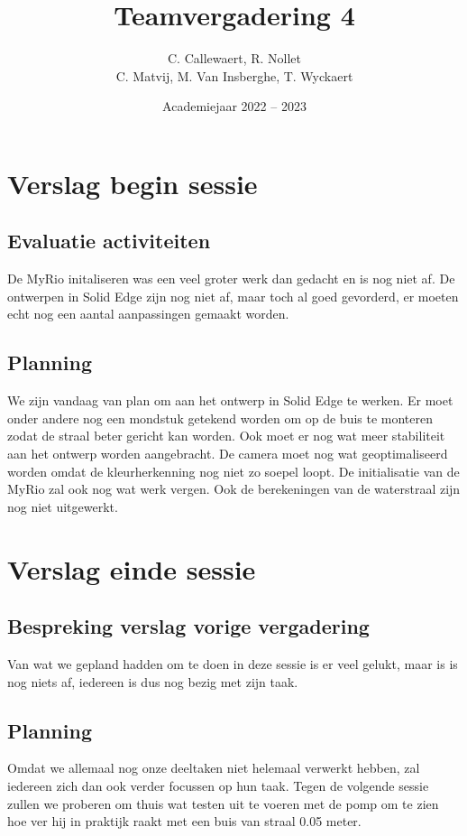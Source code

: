 \documentclass{kulakarticle}
\title{Teamvergadering 4}
\author{C. Callewaert, R. Nollet \\
	C. Matvij, M. Van Insberghe, T. Wyckaert }
\date{Academiejaar 2022 -- 2023}
\begin{document}
	\maketitle
	\section{Verslag begin sessie}

	\subsection{Evaluatie activiteiten}
		De MyRio initaliseren was een veel groter werk dan gedacht en is nog niet af. De ontwerpen in Solid Edge zijn nog niet af, maar toch al goed gevorderd, er moeten echt nog een aantal aanpassingen gemaakt worden. 
	\subsection{Planning}
	We zijn vandaag van plan om aan het ontwerp in Solid Edge te werken. Er moet onder andere nog een mondstuk getekend worden om op de buis te monteren zodat de straal beter gericht kan worden. Ook moet er nog wat meer stabiliteit aan het ontwerp worden aangebracht. De camera moet nog wat geoptimaliseerd worden omdat de kleurherkenning nog niet zo soepel loopt. De initialisatie van de MyRio zal ook nog wat werk vergen. Ook de berekeningen van de waterstraal zijn nog niet uitgewerkt.


	
	\section{Verslag einde sessie}
	
	\subsection{Bespreking verslag vorige vergadering}
	
	Van wat we gepland hadden om te doen in deze sessie is er veel gelukt, maar is is nog niets af, iedereen is dus nog bezig met zijn taak.
	
	\subsection{Planning}
	Omdat we allemaal nog onze deeltaken niet helemaal verwerkt hebben, zal iedereen zich dan ook verder focussen op hun taak. Tegen de volgende sessie zullen we proberen om thuis wat testen uit te voeren met de pomp om te zien hoe ver hij in praktijk raakt met een buis van straal 0.05 meter. 
	

	

	
\end{document}

